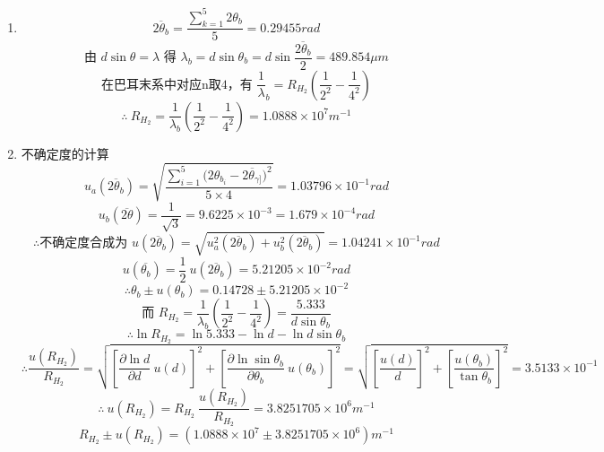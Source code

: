 \documentclass[11pt,a4paper,oneside]{article}
\begin{document}
\begin{enumerate}
  \item { }
      $$\overline{2{\theta}_b} = \displaystyle\frac{\sum_{k=1}^5 2{\theta}_b}{5} = 0.29455rad$$
      $$\displaystyle\text{由\ }d\sin{\theta} = {\lambda}\text{\ 得\ }{\lambda}_b = d\sin{\theta}_b = d\sin{\frac{\overline{2{\theta}_b}}{2}} = 489.854\mu m $$
      $$\displaystyle\text{在巴耳末系中对应n取4，有\ }\frac{1}{\lambda}_b = R_{H_2}\left(\frac{1}{2^2}-\frac{1}{4^2}\right)$$
      $$\therefore\ \displaystyle R_{H_2} = \frac{1}{ {\lambda}_b}\left(\frac{1}{2^2}-\frac{1}{4^2}\right) = 1.0888{\times}10^{7}m^{-1}$$
  \item {不确定度的计算}
      $$u_a(\overline{2{\theta}_b}) = \displaystyle\sqrt{\frac{\sum_{i=1}^5{(2{\theta}_{b_{i}}-\overline{2{\theta}_{\gamma]}}})^2}{5\times4}}=1.03796{\times}10^{-1}rad$$
      $$u_b(\overline{2\theta}) = \displaystyle\frac{1}{\sqrt3} = 9.6225\times10^{-3} = 1.679 \times 10^{-4} rad$$
      $$\therefore\text{不确定度合成为\ }u(\overline{2{\theta}_b}) = \sqrt{u_a^2(\overline{2{\theta}_b})+u_b^2(\overline{2{\theta}_b})} = 1.04241{\times}10^{-1}rad$$
      $$u(\overline{ {\theta}_b})= \displaystyle\frac12\ u(\overline{2{\theta}_b}) = 5.21205{\times}10^{-2}rad$$
      $$\therefore{\theta}_b \pm u({\theta}_b) = 0.14728 \pm 5.21205{\times}10^{-2}$$
      $$\text{而\ }\displaystyle R_{H_2} = \frac{1}{ {\lambda}_b}\left(\frac{1}{2^2}-\frac{1}{4^2}\right) = \frac{5.333}{d\sin{\theta}_b}$$
      $$\therefore\ln{R_{H_2}} = \ln{5.333} -\ln{d} - \ln{d\sin{\theta}_b}$$
      $$\therefore\displaystyle \frac{u(R_{H_2})}{R_{H_2}} = \sqrt{ {\left[\frac{\partial{\ln{d}}}{\partial{d}}\ u(d)\right]}^2 + {\left[\frac{\partial{\ln{\sin{ {\theta}_b}}}}{\partial{ {\theta}_b}}\ u({\theta}_b)\right]}^2} = \sqrt{ {\left[\frac{u(d)}{d}\right]}^2 + {\left[\frac{u({\theta}_b)}{\tan{ {\theta}_b}}\right]}^2} = 3.5133{\times}10^{-1}$$
      $$\therefore \ u(R_{H_2}) = \displaystyle R_{H_2}\ \frac{u(R_{H_2})}{R_{H_2}} = 3.8251705{\times}10^{6}m^{-1}$$ 
      $$R_{H_2} \pm u(R_{H_2}) = (1.0888{\times}10^{7} \pm 3.8251705{\times}10^{6})m^{-1}$$
\end{enumerate}
\end{document}
